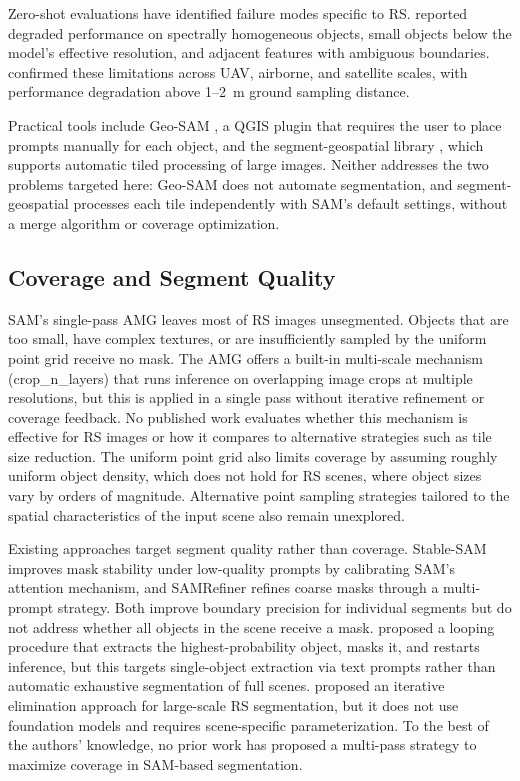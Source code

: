 \documentclass[review,11pt,authoryear]{elsarticle}
\begin{document}
Zero-shot evaluations have identified failure modes specific to RS. \citet{ren2024segment_anything_everywhere} reported degraded performance on spectrally homogeneous objects, small objects below the model's effective resolution, and adjacent features with ambiguous boundaries. \citet{osco2023sam_rs_review} confirmed these limitations across UAV, airborne, and satellite scales, with performance degradation above 1--2~m ground sampling distance.

Practical tools include Geo-SAM \citep{zhao2023geosam}, a QGIS plugin that requires the user to place prompts manually for each object, and the segment-geospatial library \citep{wu2023samgeo}, which supports automatic tiled processing of large images. Neither addresses the two problems targeted here: Geo-SAM does not automate segmentation, and segment-geospatial processes each tile independently with SAM's default settings, without a merge algorithm or coverage optimization.

\subsection{Coverage and Segment Quality}
\label{sec:related_coverage}

SAM's single-pass AMG leaves most of RS images unsegmented. Objects that are too small, have complex textures, or are insufficiently sampled by the uniform point grid receive no mask. The AMG offers a built-in multi-scale mechanism (crop\_n\_layers) that runs inference on overlapping image crops at multiple resolutions, but this is applied in a single pass without iterative refinement or coverage feedback. No published work evaluates whether this mechanism is effective for RS images or how it compares to alternative strategies such as tile size reduction. The uniform point grid also limits coverage by assuming roughly uniform object density, which does not hold for RS scenes, where object sizes vary by orders of magnitude. Alternative point sampling strategies tailored to the spatial characteristics of the input scene also remain unexplored.

Existing approaches target segment quality rather than coverage. Stable-SAM \citep{fan2025stablesam} improves mask stability under low-quality prompts by calibrating SAM's attention mechanism, and SAMRefiner \citep{lin2025samrefiner} refines coarse masks through a multi-prompt strategy. Both improve boundary precision for individual segments but do not address whether all objects in the scene receive a mask. \citet{osco2023sam_rs_review} proposed a looping procedure that extracts the highest-probability object, masks it, and restarts inference, but this targets single-object extraction via text prompts rather than automatic exhaustive segmentation of full scenes. \citet{shepherd2019large_scale} proposed an iterative elimination approach for large-scale RS segmentation, but it does not use foundation models and requires scene-specific parameterization. To the best of the authors' knowledge, no prior work has proposed a multi-pass strategy to maximize coverage in SAM-based segmentation.
\end{document}
